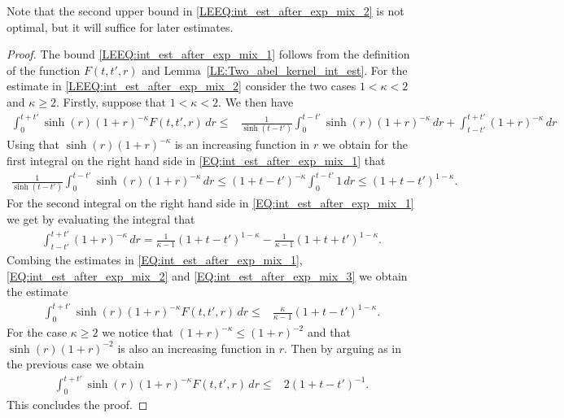 \documentclass[11pt,twoside,reqno]{amsart}
\newcommand{\1}{\mathrm{\mathbf{1}}}
\numberwithin{equation}{section}
\theoremstyle{plain}
\theoremstyle{definition}
\theoremstyle{remark}
\begin{document}
Note that the second upper bound in \eqref{LEEQ:int_est_after_exp_mix_2} is not optimal, but it will suffice for later estimates.

\begin{proof}
The bound \eqref{LEEQ:int_est_after_exp_mix_1} follows from the definition of the function $F(t,t',r)$ and Lemma~\ref{LE:Two_abel_kernel_int_est}.
For the estimate in \eqref{LEEQ:int_est_after_exp_mix_2} consider the two cases $1<\kappa<2$ and $\kappa\geq 2$. 
Firstly, suppose that $1<\kappa<2$. We then have
    \begin{equation}\label{EQ:int_est_after_exp_mix_1}
    \begin{aligned}
       \int_{0}^{t+t'} \sinh(r) (1+r)^{-\kappa}   F(t,t',r)\, d r \leq {}&  \frac{1}{\sinh(t-t')}\int_{0}^{t-t'} \sinh(r) (1+r)^{-\kappa}    \, d r 
       + \int_{t-t'}^{t+t'}  (1+r)^{-\kappa}   \, d r  
       \end{aligned}
    \end{equation}
Using that $\sinh(r) (1+r)^{-\kappa}$ is an increasing function in $r$ we obtain for the first integral on the right hand side in \eqref{EQ:int_est_after_exp_mix_1} that
\begin{equation}\label{EQ:int_est_after_exp_mix_2}
    \begin{aligned}
         \frac{1}{\sinh(t-t')}\int_{0}^{t-t'} \sinh(r) (1+r)^{-\kappa}    \, d r  \leq (1+t-t')^{-\kappa} \int_{0}^{t-t'} 1   \, d r \leq (1+t-t')^{1-\kappa}.
    \end{aligned}
\end{equation}
For the second integral on the right hand side in \eqref{EQ:int_est_after_exp_mix_1} we get by evaluating the integral that
    \begin{equation}\label{EQ:int_est_after_exp_mix_3}
    \begin{aligned}
       \int_{t-t'}^{t+t'}  (1+r)^{-\kappa}   \, d r = \frac{1}{\kappa-1} (1+t-t')^{1-\kappa} - \frac{1}{\kappa-1} (1+t+t')^{1-\kappa}.   
       \end{aligned}
    \end{equation}
Combing the estimates in \eqref{EQ:int_est_after_exp_mix_1}, \eqref{EQ:int_est_after_exp_mix_2} and \eqref{EQ:int_est_after_exp_mix_3} we obtain the estimate
\begin{equation}\label{EQ:int_est_after_exp_mix_4}
    \begin{aligned}
       \int_{0}^{t+t'} \sinh(r) (1+r)^{-\kappa}   F(t,t',r)\, d r \leq {}&  \frac{\kappa}{\kappa -1}(1+t-t')^{1-\kappa}.  
    \end{aligned}
\end{equation}
For the case $\kappa\geq 2$ we notice that $(1+r)^{-\kappa} \leq (1+r)^{-2}$ and that $\sinh(r) (1+r)^{-2}$ is also an increasing function in $r$. Then by arguing as in the previous case we obtain
\begin{equation}
    \begin{aligned}
       \int_{0}^{t+t'} \sinh(r) (1+r)^{-\kappa}   F(t,t',r)\, d r \leq {}&  2(1+t-t')^{-1}.
    \end{aligned}
\end{equation}
This concludes the proof.
\end{proof}
\end{document}
